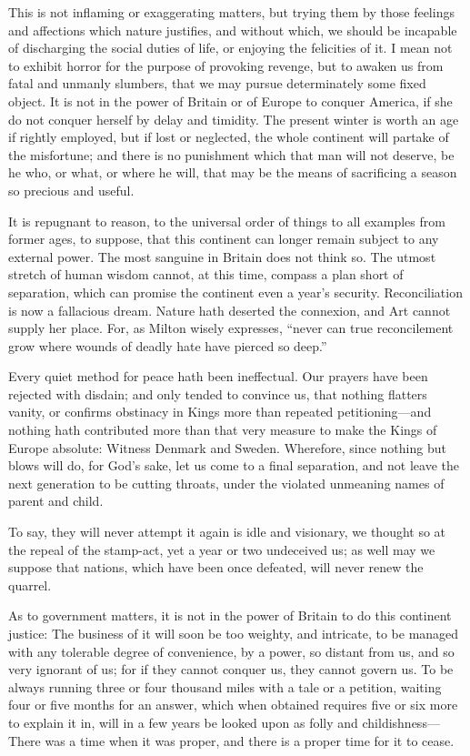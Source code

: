 \documentclass[12pt,oneside]{memoir}
\begin{document}
This is not inflaming or exaggerating matters, but trying them by those feelings and affections which nature justifies, and without which, we should be incapable of discharging the social duties of life, or enjoying the felicities of it. I mean not to exhibit horror for the purpose of provoking revenge, but to awaken us from fatal and unmanly slumbers, that we may pursue determinately some fixed object. It is not in the power of Britain or of Europe to conquer America, if she do not conquer herself by delay and timidity. The present winter is worth an age if rightly employed, but if lost or neglected, the whole continent will partake of the misfortune; and there is no punishment which that man will not deserve, be he who, or what, or where he will, that may be the means of sacrificing a season so precious and useful.

It is repugnant to reason, to the universal order of things to all examples from former ages, to suppose, that this continent can longer remain subject to any external power. The most sanguine in Britain does not think so. The utmost stretch of human wisdom cannot, at this time, compass a plan short of separation, which can promise the continent even a year's security. Reconciliation is now a fallacious dream. Nature hath deserted the connexion, and Art cannot supply her place. For, as Milton wisely expresses, ``never can true reconcilement grow where wounds of deadly hate have pierced so deep.''

Every quiet method for peace hath been ineffectual. Our prayers have been rejected with disdain; and only tended to convince us, that nothing flatters vanity, or confirms obstinacy in Kings more than repeated petitioning---and nothing hath contributed more than that very measure to make the Kings of Europe absolute: Witness Denmark and Sweden. Wherefore, since nothing but blows will do, for God's sake, let us come to a final separation, and not leave the next generation to be cutting throats, under the violated unmeaning names of parent and child.

To say, they will never attempt it again is idle and visionary, we thought so at the repeal of the stamp-act, yet a year or two undeceived us; as well may we suppose that nations, which have been once defeated, will never renew the quarrel.

As to government matters, it is not in the power of Britain to do this continent justice: The business of it will soon be too weighty, and intricate, to be managed with any tolerable degree of convenience, by a power, so distant from us, and so very ignorant of us; for if they cannot conquer us, they cannot govern us. To be always running three or four thousand miles with a tale or a petition, waiting four or five months for an answer, which when obtained requires five or six more to explain it in, will in a few years be looked upon as folly and childishness---There was a time when it was proper, and there is a proper time for it to cease.
\end{document}

